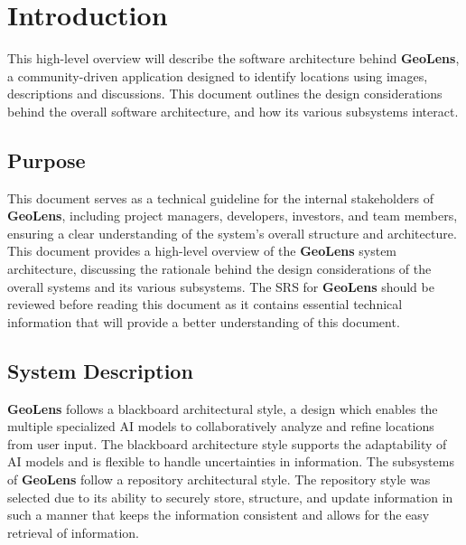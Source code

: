 \documentclass[]{article}
\begin{document}
\newpage
\section{Introduction}
\label{sec:introduction}

This high-level overview will describe the software architecture behind \textbf{GeoLens}, a community-driven application designed to identify locations using images, descriptions and discussions. This document outlines the design considerations behind the overall software architecture, and how its various subsystems interact.  

\subsection{Purpose}
\label{sub:purpose}
This document serves as a technical guideline for the internal stakeholders of \textbf{GeoLens}, including project managers, developers, investors, and team members, ensuring a clear understanding of the system's overall structure and architecture. This document provides a high-level overview of the \textbf{GeoLens} system architecture, discussing the rationale behind the design considerations of the overall systems and its various subsystems. The SRS for \textbf{GeoLens} should be reviewed before reading this document as it contains essential technical information that will provide a better understanding of this document.%

\subsection{System Description}
\label{sub:system_description}
\textbf{GeoLens} follows a blackboard architectural style, a design which enables the multiple specialized AI models to collaboratively analyze and refine locations from user input. The blackboard architecture style supports the adaptability of AI models and is flexible to handle uncertainties in information. The subsystems of \textbf{GeoLens} follow a repository architectural style. The repository style was selected due to its ability to securely store, structure, and update information in such a manner that keeps the information consistent and allows for the easy retrieval of information. 

\end{document}

